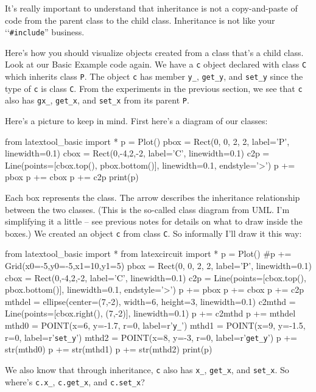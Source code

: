 \newpage{}

It's really important to understand that inheritance is not a copy-and-paste of code from the parent class to the child class. Inheritance is not like your \lq\lq \verb!#include!'' business.

Here's how you should visualize objects created from a class that's a child class. Look at our Basic Example code again. We have a \verb!c! object declared with class \verb!C! which inherits class \verb!P!. The object \verb!c! has member \verb!y_!, \verb!get_y!, and \verb!set_y! since the type of \verb!c! is class \verb!C!. From the experiments in the previous section, we see that \verb!c! also has \verb!gx_!, \verb!get_x!, and \verb!set_x! from its parent \verb!P!.

Here's a picture to keep in mind. First here's a diagram of our classes:
\begin{python}
from latextool_basic import *
p = Plot()
pbox = Rect(0, 0, 2, 2, label='P', linewidth=0.1)
cbox = Rect(0,-4,2,-2, label='C', linewidth=0.1)
c2p = Line(points=[cbox.top(), pbox.bottom()], linewidth=0.1, endstyle='>')
p += pbox
p += cbox
p += c2p
print(p)
\end{python}
Each box represents the class. The arrow describes the inheritance
relationship between the two classes. (This is the so-called class
diagram from UML. I'm simplifying it a little -- see previous notes for
details on what to draw inside the boxes.) We created an object \verb!c!
from class \verb!C!. So informally I'll draw it this way:
\begin{python}
from latextool_basic import *
from latexcircuit import *
p = Plot()
#p += Grid(x0=-5,y0=-5,x1=10,y1=5)
pbox = Rect(0, 0, 2, 2, label='P', linewidth=0.1)
cbox = Rect(0,-4,2,-2, label='C', linewidth=0.1)
c2p = Line(points=[cbox.top(), pbox.bottom()], linewidth=0.1, endstyle='>')
p += pbox
p += cbox
p += c2p
mthdel = ellipse(center=(7,-2), width=6, height=3, linewidth=0.1)
c2mthd = Line(points=[cbox.right(), (7,-2)], linewidth=0.1)
p += c2mthd
p += mthdel
mthd0 = POINT(x=6, y=-1.7, r=0, label=r'\verb!y_!')
mthd1 = POINT(x=9, y=-1.5, r=0, label=r'\verb!set_y!')
mthd2 = POINT(x=8, y=-3, r=0, label=r'\verb!get_y!')
p += str(mthd0)
p += str(mthd1)
p += str(mthd2)
print(p)
\end{python}
We also know that through inheritance, \verb!c! also has \verb!x_!,
\verb!get_x!, and \verb!set_x!. So where's \verb!c.x_!,
\verb!c.get_x!, and \verb!c.set_x!?

